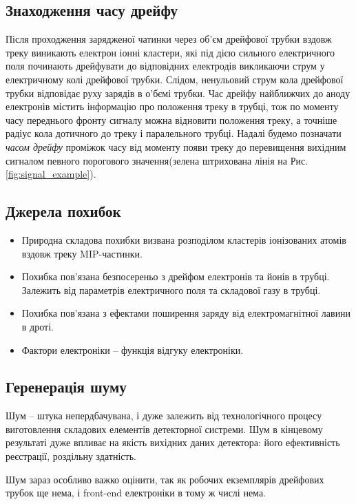 \documentclass[]{article}
\begin{document}
	\subsection{Знаходження часу дрейфу}
	Після проходження зарядженої чатинки через об’єм дрейфової трубки вздовж треку виникають електрон іонні кластери, які під дією сильного електричного поля починають дрейфувати до відповідних електродів викликаючи струм у електричному колі дрейфової трубки. Слідом, ненульовий струм кола дрейфової трубки відповідає руху зарядів в о’бємі трубки. Час дрейфу найближчих до аноду електронів містить інформацію про положення треку в трубці, тож по моменту часу переднього фронту сигналу можна відновити положення треку, а точніше радіус кола дотичного до треку і паралельного трубці. Надалі будемо позначати {\it часом дрейфу} проміжок часу від моменту появи треку до перевищення вихідним сигналом певного порогового значення(зелена штрихована лінія на Рис. \ref{fig:signal_example}).
	
	\subsection{Джерела похибок}
	
	\begin{itemize}
		\item Природна складова похибки визвана розподілом кластерів іонізованих атомів вздовж треку MIP-частинки.\par
		\item Похибка пов’язана безпосереньо з дрейфом електронів та йонів в трубці. Залежить від параметрів електричного поля та складової газу в трубці.
		\item Похибка пов’язана з ефектами поширення заряду від електромагнітної лавини в дроті.
		\item Фактори електроніки -- функція відгуку електроніки.
	\end{itemize}
	
	\subsection{Геренерація шуму}
	Шум -- штука непердбачувана, і дуже залежить від технологічного процесу виготовлення складових елементів детекторної систреми. Шум в кінцевому результаті дуже впливає на якість вихідних даних детектора: його ефективність реєстрації, роздільну здатність.
	
	Шум зараз особливо важко оцінити, так як робочих екземплярів дрейфових трубок ще нема, і front-end електроніки в тому ж числі нема.
	
\end{document}
